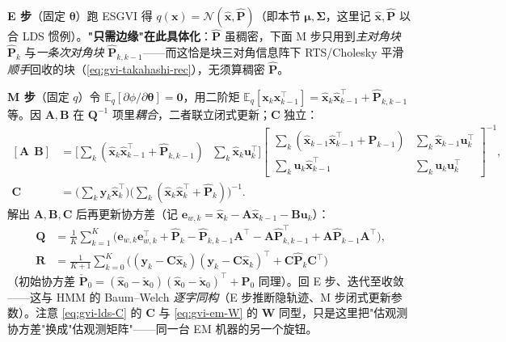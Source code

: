 \textbf{E 步}（固定 $\boldsymbol{\theta}$）跑 ESGVI 得 $q(\mathbf{x})=\mathcal{N}(\hat{\mathbf{x}},\hat{\mathbf{P}})$（即本节 $\boldsymbol{\mu},\boldsymbol{\Sigma}$，这里记 $\hat{\mathbf{x}},\hat{\mathbf{P}}$ 以合 LDS 惯例）。\textbf{"只需边缘"在此具体化}：$\hat{\mathbf{P}}$ 虽稠密，下面 M 步只用到\emph{主对角块} $\hat{\mathbf{P}}_k$ 与\emph{一条次对角块} $\hat{\mathbf{P}}_{k,k-1}$——而这恰是块三对角信息阵下 RTS/Cholesky 平滑\emph{顺手}回收的块（\cref{eq:gvi-takahashi-rec}），无须算稠密 $\hat{\mathbf{P}}$。

\textbf{M 步}（固定 $q$）令 $\mathbb{E}_q[\partial\phi/\partial\boldsymbol{\theta}]=\mathbf{0}$，用二阶矩 $\mathbb{E}_q[\mathbf{x}_k\mathbf{x}_{k-1}^\top]=\hat{\mathbf{x}}_k\hat{\mathbf{x}}_{k-1}^\top+\hat{\mathbf{P}}_{k,k-1}$ 等。因 $\mathbf{A},\mathbf{B}$ 在 $\mathbf{Q}^{-1}$ 项里\emph{耦合}，二者联立闭式更新；$\mathbf{C}$ 独立：
\begin{subequations}\label{eq:gvi-lds-update}
\begin{align}
  [\mathbf{A}\ \ \mathbf{B}]&=\Big[\textstyle\sum_k(\hat{\mathbf{x}}_k\hat{\mathbf{x}}_{k-1}^\top+\hat{\mathbf{P}}_{k,k-1})\ \ \ \sum_k\hat{\mathbf{x}}_k\mathbf{u}_k^\top\Big]
  \begin{bmatrix}\textstyle\sum_k(\hat{\mathbf{x}}_{k-1}\hat{\mathbf{x}}_{k-1}^\top+\hat{\mathbf{P}}_{k-1})&\textstyle\sum_k\hat{\mathbf{x}}_{k-1}\mathbf{u}_k^\top\\[3pt]\textstyle\sum_k\mathbf{u}_k\hat{\mathbf{x}}_{k-1}^\top&\textstyle\sum_k\mathbf{u}_k\mathbf{u}_k^\top\end{bmatrix}^{-1}\!\!,\label{eq:gvi-lds-AB}\\
  \mathbf{C}&=\Big(\textstyle\sum_k\mathbf{y}_k\hat{\mathbf{x}}_k^\top\Big)\Big(\textstyle\sum_k(\hat{\mathbf{x}}_k\hat{\mathbf{x}}_k^\top+\hat{\mathbf{P}}_k)\Big)^{-1}.\label{eq:gvi-lds-C}
\end{align}
\end{subequations}
解出 $\mathbf{A},\mathbf{B},\mathbf{C}$ 后再更新协方差（记 $\mathbf{e}_{w,k}=\hat{\mathbf{x}}_k-\mathbf{A}\hat{\mathbf{x}}_{k-1}-\mathbf{B}\mathbf{u}_k$）：
\begin{align}
  \mathbf{Q}&=\tfrac1K\textstyle\sum_{k=1}^K\big(\mathbf{e}_{w,k}\mathbf{e}_{w,k}^\top+\hat{\mathbf{P}}_k-\hat{\mathbf{P}}_{k,k-1}\mathbf{A}^\top-\mathbf{A}\hat{\mathbf{P}}_{k,k-1}^\top+\mathbf{A}\hat{\mathbf{P}}_{k-1}\mathbf{A}^\top\big),\label{eq:gvi-lds-Q}\\
  \mathbf{R}&=\tfrac1{K+1}\textstyle\sum_{k=0}^K\big((\mathbf{y}_k-\mathbf{C}\hat{\mathbf{x}}_k)(\mathbf{y}_k-\mathbf{C}\hat{\mathbf{x}}_k)^\top+\mathbf{C}\hat{\mathbf{P}}_k\mathbf{C}^\top\big)\label{eq:gvi-lds-R}
\end{align}
（初始协方差 $\check{\mathbf{P}}_0=(\hat{\mathbf{x}}_0-\check{\mathbf{x}}_0)(\hat{\mathbf{x}}_0-\check{\mathbf{x}}_0)^\top+\hat{\mathbf{P}}_0$ 同理）。回 E 步、迭代至收敛——这与 HMM 的 Baum--Welch \emph{逐字同构}（E 步推断隐轨迹、M 步闭式更新参数）。注意 \cref{eq:gvi-lds-C} 的 $\mathbf{C}$ 与 \cref{eq:gvi-em-W} 的 $\mathbf{W}$ 同型，只是这里把"估观测协方差"换成"估观测矩阵"——同一台 EM 机器的另一个旋钮。

